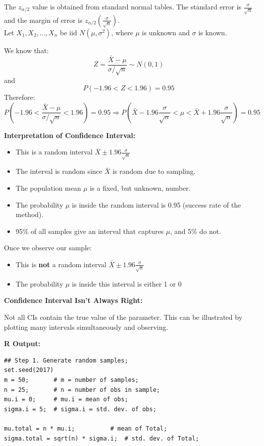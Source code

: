 The $z_{\alpha/2}$ value is obtained from standard normal tables. The standard error is $\frac{\sigma}{\sqrt{n}}$ and the margin of error is $z_{\alpha/2} \left( \frac{\sigma}{\sqrt{n}} \right)$.
\vspace{0.5em} \\
Let $X_1, X_2, ..., X_n$ be iid $N(\mu, \sigma^2)$, where $\mu$ is unknown and $\sigma$ is known.

We know that:
\[
Z = \frac{\bar{X} - \mu}{\sigma / \sqrt{n}} \sim N(0, 1)
\]
and
\[
P(-1.96 < Z < 1.96) = 0.95
\]
Therefore:
\[
P\left( -1.96 < \frac{\bar{X} - \mu}{\sigma / \sqrt{n}} < 1.96 \right) = 0.95
\Rightarrow P\left( \bar{X} - 1.96 \frac{\sigma}{\sqrt{n}} < \mu < \bar{X} + 1.96 \frac{\sigma}{\sqrt{n}} \right) = 0.95
\]

\vspace{1.5em}
\textbf{Interpretation of Confidence Interval:}

\begin{itemize}
  \item This is a random interval $\bar{X} \pm 1.96 \frac{\sigma}{\sqrt{n}}$
  \item The interval is random since $\bar{X}$ is random due to sampling.
  \item The population mean $\mu$ is a fixed, but unknown, number.
  \item The probability $\mu$ is inside the random interval is 0.95 (success rate of the method).
  \item 95\% of all samples give an interval that captures $\mu$, and 5\% do not.
\end{itemize}

\vspace{1em}
Once we observe our sample:

\begin{itemize}
  \item This is \textbf{not} a random interval $\bar{X} \pm 1.96 \frac{\sigma}{\sqrt{n}}$
  \item The probability $\mu$ is inside this interval is either 1 or 0
\end{itemize}

\vspace{1em}
\textbf{Confidence Interval Isn’t Always Right:}

Not all CIs contain the true value of the parameter. This can be illustrated by plotting many intervals simultaneously and observing.


\vspace{2em}
\textbf{R Output:}
\begin{tcolorbox}[colback=gray!10, colframe=black!45, arc=2mm]
\begin{verbatim}
## Step 1. Generate random samples;
set.seed(2017)
m = 50;       # m = number of samples;
n = 25;       # n = number of obs in sample;
mu.i = 0;     # mu.i = mean of obs;
sigma.i = 5;  # sigma.i = std. dev. of obs;

mu.total = n * mu.i;          # mean of Total;
sigma.total = sqrt(n) * sigma.i;  # std. dev. of Total;
\end{verbatim}
\end{tcolorbox}

